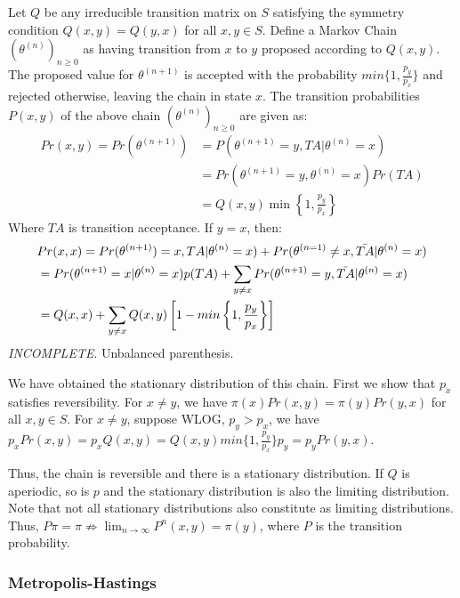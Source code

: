 \documentclass[paper=a4, fontsize=12pt]{scrartcl} %
\numberwithin{equation}{section} %
\numberwithin{figure}{section} %
\numberwithin{table}{section} %
\begin{document}
Let $Q$ be any irreducible transition matrix on $S$ satisfying the symmetry condition $Q(x, y) = Q(y, x)$ for 
all $x, y \in S$. Define a Markov Chain $(\theta^{(n)})_{n \ge 0}$ as having transition from $x$ to $y$ 
proposed according to $Q(x, y)$.
The proposed value for $\theta^{(n+1)}$ is accepted with the probability $min \{ 1, \frac{p_y}{p_x}\}$ and rejected otherwise, leaving the chain in state $x$.
The transition probabilities $P(x, y)$ of the above chain $(\theta^{(n)})_{n \ge 0}$ are given as:
\begin{align*}
    Pr(x, y) = Pr(\theta^{(n+1)}) &= P(\theta^{(n+1)} = y, TA| \theta^{(n)} = x)\\
    &= Pr(\theta^{(n+1)} = y, \theta^{(n)} = x) Pr(TA)\\
    &= Q(x, y) \min \left\{ 1, \frac{p_y}{p_x} \right\}
\end{align*}
Where $TA$ is transition acceptance. If $y = x$, then:
\begin{align*}
    &Pr(x, x) = Pr(\theta^{(n+1)}) = x, TA| \theta^{(n)} = x) + Pr(\theta^{(n=1)} \neq x, \Bar{TA}| \theta^{(n)}=x)\\
    &= Pr(\theta^{(n+1)} = x|\theta^{(n)} = x)p(TA) + \sum_{y \neq x}Pr(\theta^{(n+1)} =y, \Bar{TA}| \theta^{(n)} = x)\\
    &= Q(x, x) + \sum_{y \neq x} Q(x, y) \left[ 1 - min \left\{ 1, \frac{p_y}{p_x}\right\} \right]
\end{align*}
\textit{INCOMPLETE}. Unbalanced parenthesis.

We have obtained the stationary distribution of this chain. First we show that $p_x$ satisfies 
reversibility. For $x \neq y$, we have $\pi(x) Pr(x, y) = \pi(y) Pr(y, x)$ for all $x, y \in S$. 
For $x \neq y$, suppose WLOG, $p_y > p_x$, we have $p_x Pr(x, y) = p_x Q(x, y) = Q(x, y) min \{ 1, \frac{p_y}{p_x}\} p_y = p_y Pr(y, x)$.

Thus, the chain is reversible and there is a stationary distribution. If $Q$ is aperiodic, so 
is $p$ and the stationary distribution is also the limiting distribution. Note that not all stationary distributions 
also constitute as limiting distributions. Thus, $P\pi = \pi \nRightarrow \lim_{n \rightarrow \infty} P^n(x, y) = \pi(y)$, where $P$ is the transition probability.

\subsubsection{Metropolis-Hastings}
\end{document}
